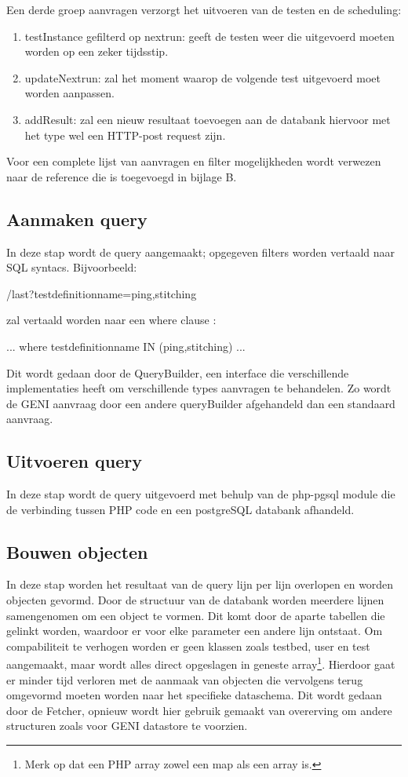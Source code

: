 \clearpage
Een derde groep aanvragen verzorgt het uitvoeren van de testen en de scheduling:
\begin{enumerate}
\item testInstance gefilterd op nextrun: geeft de testen weer die uitgevoerd moeten worden op een zeker tijdsstip.
\item updateNextrun: zal het moment waarop de volgende test uitgevoerd moet worden aanpassen.
\item addResult: zal een nieuw resultaat toevoegen aan de databank hiervoor met het type wel een HTTP-post request zijn.
\end{enumerate}
\npar
Voor een complete lijst van aanvragen en filter mogelijkheden wordt verwezen naar de reference die is toegevoegd in bijlage B.
\subsection{Aanmaken query}
\npar 
In deze stap wordt de query aangemaakt; opgegeven filters worden vertaald naar SQL syntacs. Bijvoorbeeld:
\begin{lt}
/last?testdefinitionname=ping,stitching
\end{lt}
zal vertaald worden naar een where clause :
\begin{lt}
... where testdefinitionname IN (ping,stitching) ...
\end{lt}
\npar
Dit wordt gedaan door de QueryBuilder, een interface die verschillende implementaties heeft om verschillende types aanvragen te behandelen. Zo wordt de GENI aanvraag door een andere queryBuilder afgehandeld dan een standaard aanvraag.

\subsection{Uitvoeren query}
\npar
In deze stap wordt de query uitgevoerd met behulp van de php-pgsql module die de verbinding tussen PHP code en een postgreSQL databank afhandeld.
\clearpage
\subsection{Bouwen objecten}
\npar
In deze stap worden het resultaat van de query lijn per lijn overlopen en worden objecten gevormd. Door de structuur van de databank worden meerdere lijnen samengenomen om een object te vormen. Dit komt door de aparte tabellen die gelinkt worden, waardoor er voor elke parameter een andere lijn ontstaat.
\npar
Om compabiliteit te verhogen worden er geen klassen zoals testbed, user en test aangemaakt, maar wordt alles direct opgeslagen in geneste array\footnote{Merk op dat een PHP array zowel een map als een array is.}. Hierdoor gaat er minder tijd verloren met de aanmaak van objecten die vervolgens terug omgevormd moeten worden naar het specifieke dataschema. Dit wordt gedaan door de Fetcher, opnieuw wordt hier gebruik gemaakt van overerving om andere structuren zoals voor GENI datastore te voorzien.
